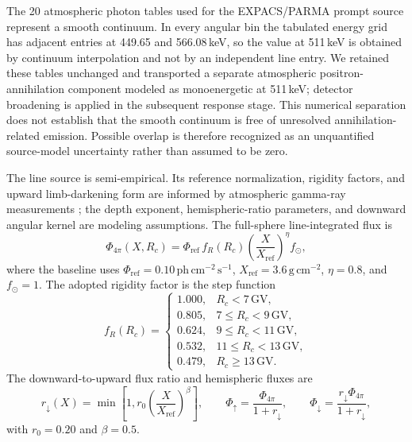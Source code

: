 \documentclass[11pt]{article}
\begin{document}
The 20 atmospheric photon tables used for the EXPACS/PARMA prompt source represent
a smooth continuum. In every angular bin the tabulated energy grid has adjacent
entries at 449.65 and 566.08\,keV, so the value at 511\,keV is obtained by
continuum interpolation and not by an independent line entry. We retained these
tables unchanged and transported a separate atmospheric positron-annihilation
component modeled as monoenergetic at 511\,keV; detector broadening is applied in
the subsequent response stage. This numerical
separation does not establish that the smooth continuum is free of unresolved
annihilation-related emission. Possible overlap is therefore recognized as an
unquantified source-model uncertainty rather than assumed to be zero.

The line source is semi-empirical. Its reference normalization, rigidity factors,
and upward limb-darkening form are informed by atmospheric gamma-ray measurements
\cite{Mahoney1981Atmospheric,Harris2003Atmospheric}; the depth exponent,
hemispheric-ratio parameters, and downward angular kernel are modeling assumptions.
The full-sphere line-integrated flux is
\begin{equation}
  \Phi_{4\pi}(X,R_c)=\Phi_{\mathrm{ref}}\,f_R(R_c)
  \left(\frac{X}{X_{\mathrm{ref}}}\right)^{\eta} f_{\odot},
  \label{eq:atm511_flux}
\end{equation}
where the baseline uses $\Phi_{\mathrm{ref}}=0.10\,
\mathrm{ph\,cm^{-2}\,s^{-1}}$, $X_{\mathrm{ref}}=3.6\,
\mathrm{g\,cm^{-2}}$, $\eta=0.8$, and $f_{\odot}=1$. The adopted rigidity
factor is the step function
\begin{equation}
 f_R(R_c)=
 \begin{cases}
  1.000, & R_c<7\,\mathrm{GV},\\
  0.805, & 7\le R_c<9\,\mathrm{GV},\\
  0.624, & 9\le R_c<11\,\mathrm{GV},\\
  0.532, & 11\le R_c<13\,\mathrm{GV},\\
  0.479, & R_c\ge13\,\mathrm{GV}.
 \end{cases}
 \label{eq:atm511_rigidity}
\end{equation}
The downward-to-upward flux ratio and hemispheric fluxes are
\begin{equation}
  r_{\downarrow}(X)=\min\!\left[1,r_0
  \left(\frac{X}{X_{\mathrm{ref}}}\right)^{\beta}\right],\qquad
  \Phi_{\uparrow}=\frac{\Phi_{4\pi}}{1+r_{\downarrow}},\qquad
  \Phi_{\downarrow}=\frac{r_{\downarrow}\Phi_{4\pi}}{1+r_{\downarrow}},
  \label{eq:atm511_split}
\end{equation}
with $r_0=0.20$ and $\beta=0.5$.
\end{document}
